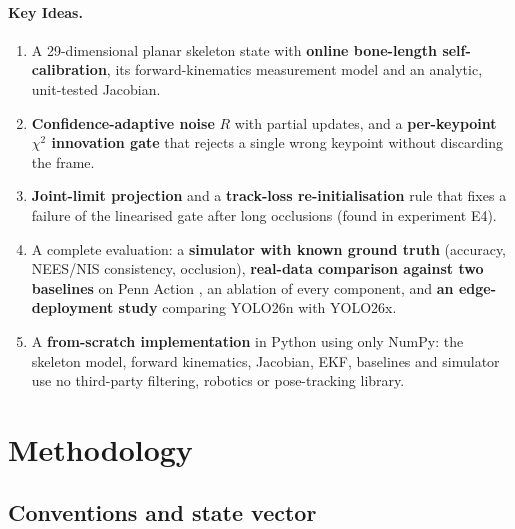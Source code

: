 \documentclass[12pt,a4paper]{article}
\begin{document}
\paragraph{Key Ideas.}
\begin{enumerate}[leftmargin=*, itemsep=1pt]
    \item A 29-dimensional planar skeleton state with \textbf{online bone-length self-calibration},
          its forward-kinematics measurement model and an analytic, unit-tested Jacobian.
    \item \textbf{Confidence-adaptive noise} $R$ with partial updates, and a
          \textbf{per-keypoint $\chi^2$ innovation gate} that rejects a single wrong keypoint without
          discarding the frame.
    \item \textbf{Joint-limit projection} and a \textbf{track-loss re-initialisation} rule that fixes a
          failure of the linearised gate after long occlusions (found in experiment E4).
    \item A complete evaluation: a \textbf{simulator with known ground truth} (accuracy, NEES/NIS consistency,
          occlusion), \textbf{real-data comparison against two baselines} on Penn Action \cite{penn}, an ablation of
          every component, and \textbf{an edge-deployment study} comparing YOLO26n with YOLO26x.
    \item A \textbf{from-scratch implementation} in Python using only NumPy: the skeleton model,
          forward kinematics, Jacobian, EKF, baselines and simulator use no third-party filtering,
          robotics or pose-tracking library.
\end{enumerate}

\section{Methodology}

\subsection{Conventions and state vector}
\end{document}
